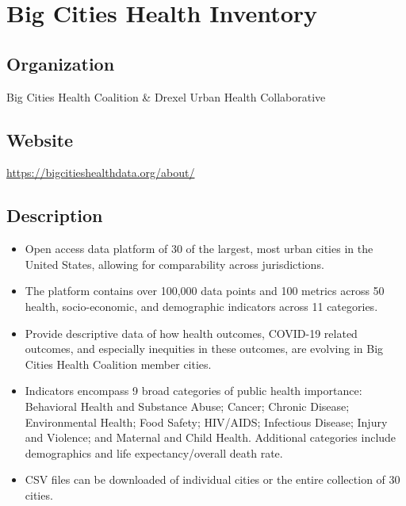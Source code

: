 \documentclass[
]{book}
\providecommand{\tightlist}{%
  \setlength{\itemsep}{0pt}\setlength{\parskip}{0pt}}
\begin{document}
\mainmatter

\hypertarget{big-cities-health-inventory}{%
\chapter{Big Cities Health Inventory}\label{big-cities-health-inventory}}

\hypertarget{organization-13}{%
\section{Organization}\label{organization-13}}

Big Cities Health Coalition \& Drexel Urban Health Collaborative

\hypertarget{website-13}{%
\section{Website}\label{website-13}}

\url{https://bigcitieshealthdata.org/about/}

\hypertarget{description-13}{%
\section{Description}\label{description-13}}

\begin{itemize}
\tightlist
\item
  Open access data platform of 30 of the largest, most urban cities in the United States, allowing for comparability across jurisdictions.
\item
  The platform contains over 100,000 data points and 100 metrics across 50 health, socio-economic, and demographic indicators across 11 categories.
\item
  Provide descriptive data of how health outcomes, COVID-19 related outcomes, and especially inequities in these outcomes, are evolving in Big Cities Health Coalition member cities.
\item
  Indicators encompass 9 broad categories of public health importance: Behavioral Health and Substance Abuse; Cancer; Chronic Disease; Environmental Health; Food Safety; HIV/AIDS; Infectious Disease; Injury and Violence; and Maternal and Child Health. Additional categories include demographics and life expectancy/overall death rate.
\item
  CSV files can be downloaded of individual cities or the entire collection of 30 cities.
\end{itemize}
\end{document}
